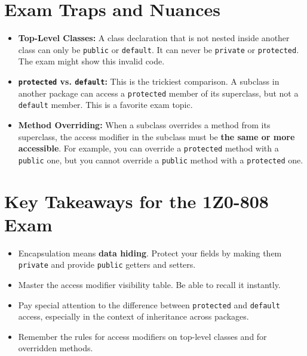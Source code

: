 \documentclass[12pt]{article}
\begin{document}
\begin{enumerate}[label=(\arabic*)]
\section{Exam Traps and Nuances}
\begin{itemize}
    \item \textbf{Top-Level Classes:} A class declaration that is not nested inside another class can only be \texttt{public} or \texttt{default}. It can never be \texttt{private} or \texttt{protected}. The exam might show this invalid code.
    \item \textbf{\texttt{protected} vs. \texttt{default}:} This is the trickiest comparison. A subclass in another package can access a \texttt{protected} member of its superclass, but not a \texttt{default} member. This is a favorite exam topic.
    \item \textbf{Method Overriding:} When a subclass overrides a method from its superclass, the access modifier in the subclass must be \textbf{the same or more accessible}. For example, you can override a \texttt{protected} method with a \texttt{public} one, but you cannot override a \texttt{public} method with a \texttt{protected} one.
\end{itemize}

\section{Key Takeaways for the 1Z0-808 Exam}
\begin{itemize}
    \item Encapsulation means \textbf{data hiding}. Protect your fields by making them \texttt{private} and provide \texttt{public} getters and setters.
    \item Master the access modifier visibility table. Be able to recall it instantly.
    \item Pay special attention to the difference between \texttt{protected} and \texttt{default} access, especially in the context of inheritance across packages.
    \item Remember the rules for access modifiers on top-level classes and for overridden methods.
\end{itemize}
\end{enumerate}
\end{document}
